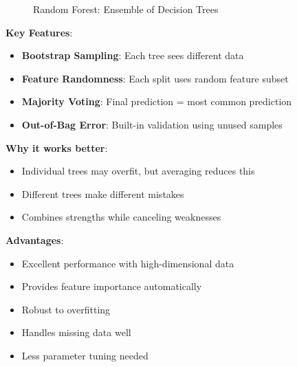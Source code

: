 \begin{figure}[h]
\vspace{0.3cm}
\caption{Random Forest: Ensemble of Decision Trees}
\vspace{1cm}
\end{figure}

\textbf{Key Features}:
\begin{itemize}
    \item \textbf{Bootstrap Sampling}: Each tree sees different data
    \item \textbf{Feature Randomness}: Each split uses random feature subset
    \item \textbf{Majority Voting}: Final prediction = most common prediction
    \item \textbf{Out-of-Bag Error}: Built-in validation using unused samples
\end{itemize}

\textbf{Why it works better}:
\begin{itemize}
    \item Individual trees may overfit, but averaging reduces this
    \item Different trees make different mistakes
    \item Combines strengths while canceling weaknesses
\end{itemize}

\textbf{Advantages}:
\begin{itemize}
    \item Excellent performance with high-dimensional data
    \item Provides feature importance automatically
    \item Robust to overfitting
    \item Handles missing data well
    \item Less parameter tuning needed
\end{itemize}

